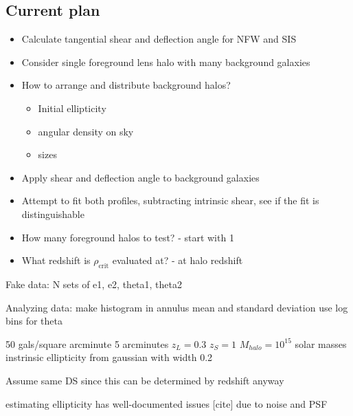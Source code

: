 \documentclass[10pt]{article}
\begin{document}
\subsection{Current plan}
\begin{itemize}
    \item Calculate tangential shear and deflection angle for NFW and SIS
    \item Consider single foreground lens halo with many background galaxies
    \item How to arrange and distribute background halos?
    \begin{itemize}
        \item Initial ellipticity
        \item angular density on sky
        \item sizes
    \end{itemize}
    \item Apply shear and deflection angle to background galaxies
    \item Attempt to fit both profiles, subtracting intrinsic shear, see if the fit is distinguishable
    \item How many foreground halos to test? - start with 1
    \item What redshift is $\rho_\mathrm{crit}$ evaluated at? - at halo redshift

\end{itemize}

Fake data:
N sets of e1, e2, theta1, theta2

Analyzing data:
make histogram in annulus
mean and standard deviation
use log bins for theta


50 gals/square arcminute
5 arcminutes
$z_L = 0.3$
$z_S = 1$
$M_{halo} = 10^15$ solar masses
instrinsic ellipticity from gaussian with width 0.2


Assume same DS since this can be determined by redshift anyway

estimating ellipticity has well-documented issues [cite] due to noise and PSF



\end{document}
